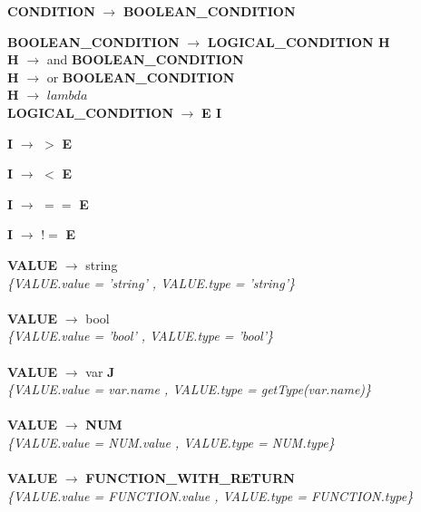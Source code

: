 \documentclass[10pt,a4paper]{article}
\begin{document}
\textbf{CONDITION} $\rightarrow$ \textbf{BOOLEAN\_CONDITION}

\textbf{BOOLEAN\_CONDITION} $\rightarrow$ \textbf{LOGICAL\_CONDITION H} \\

\textbf{H} $\rightarrow$ and \textbf{BOOLEAN\_CONDITION} \\

\textbf{H} $\rightarrow$ or \textbf{BOOLEAN\_CONDITION} \\

\textbf{H} $\rightarrow$ $lambda$ \\

\textbf{LOGICAL\_CONDITION} $\rightarrow$ \textbf{E I}

\textbf{I} $\rightarrow$ $>$ \textbf{E}

\textbf{I} $\rightarrow$ $<$ \textbf{E}

\textbf{I} $\rightarrow$ $==$ \textbf{E}

\textbf{I} $\rightarrow$ $!=$ \textbf{E}


\textbf{VALUE} $\rightarrow$ string \\

\textit{\{VALUE.value =  'string' , VALUE.type = 'string'\}}  \\ \\


\textbf{VALUE} $\rightarrow$ bool   \\

\textit{\{VALUE.value =  'bool' , VALUE.type = 'bool'\}}  \\ \\


\textbf{VALUE} $\rightarrow$ var \textbf{J} \\

\textit{\{VALUE.value =  var.name , VALUE.type = getType(var.name)\}}  \\ \\


\textbf{VALUE} $\rightarrow$ \textbf{NUM}   \\

\textit{\{VALUE.value =  NUM.value , VALUE.type = NUM.type\}}  \\ \\


\textbf{VALUE} $\rightarrow$ \textbf{FUNCTION\_WITH\_RETURN} \\

\textit{\{VALUE.value =  FUNCTION.value , VALUE.type = FUNCTION.type\}}  \\ \\
\end{document}
